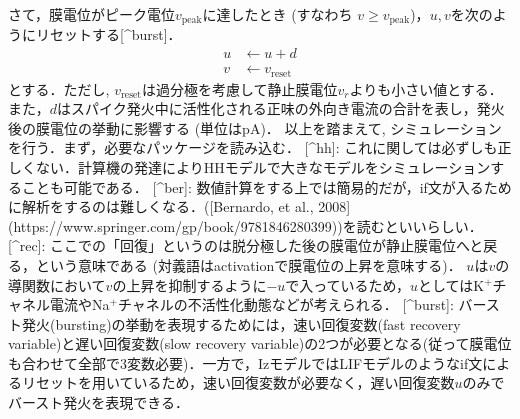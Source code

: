 さて，膜電位がピーク電位$v_{\text{peak}}$に達したとき (すなわち  $v \geq v_{\text{peak}}$)，$u, v$を次のようにリセットする[^burst]．
$$
\begin{align} 
u&\leftarrow u+d\\
v&\leftarrow v_{\text{reset}}
\end{align}
$$
とする．ただし, $v_{\text{reset}}$は過分極を考慮して静止膜電位$v_r$よりも小さい値とする．また，$d$はスパイク発火中に活性化される正味の外向き電流の合計を表し，発火後の膜電位の挙動に影響する (単位はpA)．
以上を踏まえて, シミュレーションを行う．まず，必要なパッケージを読み込む．
[^hh]: これに関しては必ずしも正しくない．計算機の発達によりHHモデルで大きなモデルをシミュレーションすることも可能である．
[^ber]: 数値計算をする上では簡易的だが，if文が入るために解析をするのは難しくなる．([Bernardo, et al., 2008](https://www.springer.com/gp/book/9781846280399))を読むといいらしい．
[^rec]: ここでの「回復」というのは脱分極した後の膜電位が静止膜電位へと戻る，という意味である (対義語はactivationで膜電位の上昇を意味する)．
$u$は$v$の導関数において$v$の上昇を抑制するように$-u$で入っているため，$u$としてはK$^+$チャネル電流やNa$^+$チャネルの不活性化動態などが考えられる．
[^burst]: バースト発火(bursting)の挙動を表現するためには，速い回復変数(fast recovery variable)と遅い回復変数(slow recovery variable)の2つが必要となる(従って膜電位も合わせて全部で3変数必要)．一方で，IzモデルではLIFモデルのようなif文によるリセットを用いているため，速い回復変数が必要なく，遅い回復変数$u$のみでバースト発火を表現できる．
